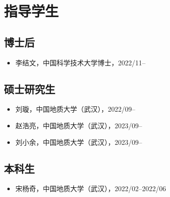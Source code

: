 \section{指导学生}

\subsection{博士后}
\begin{itemize}
\item 李结文，中国科学技术大学博士，2022/11--
\end{itemize}

\subsection{硕士研究生}
\begin{itemize}
\item 刘璇，中国地质大学（武汉），2022/09--
\item 赵浩亮，中国地质大学（武汉），2023/09--
\item 刘小余，中国地质大学（武汉），2023/09--
\end{itemize}

\subsection{本科生}
\begin{itemize}
\item 宋杨奇，中国地质大学（武汉），2022/02--2022/06
\end{itemize}
